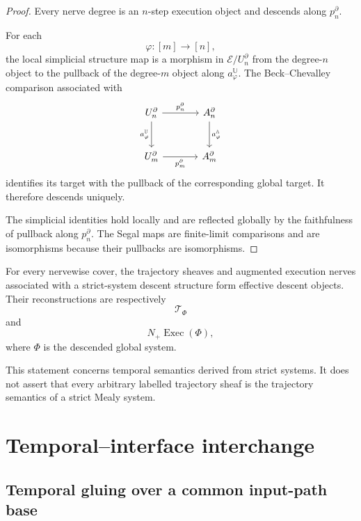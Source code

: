 \begin{proof}
Every nerve degree is an \(n\)-step execution object and descends along
\(p_n^\partial\).

For each
\[
    \varphi:[m]\to[n],
\]
the local simplicial structure map is a morphism in
\(\mathcal E/U_n^\partial\) from the degree-\(n\) object to the pullback of
the degree-\(m\) object along \(a_\varphi^{\mathbb U}\). The
Beck--Chevalley comparison associated with
\[
\begin{tikzcd}[column sep=large,row sep=large]
    U_n^\partial
        \arrow[r, "p_n^\partial"]
        \arrow[d, "a_\varphi^{\mathbb U}"']
    &
    A_n^\partial
        \arrow[d, "a_\varphi^{\mathbb A}"]
    \\
    U_m^\partial
        \arrow[r, "p_m^\partial"']
    &
    A_m^\partial
\end{tikzcd}
\]
identifies its target with the pullback of the corresponding global target.
It therefore descends uniquely.

The simplicial identities hold locally and are reflected globally by the
faithfulness of pullback along \(p_n^\partial\). The Segal maps are
finite-limit comparisons and are isomorphisms because their pullbacks are
isomorphisms.
\end{proof}

\begin{corollary}
\label{cor:stack-temporal-execution-semantics}
For every nervewise cover, the trajectory sheaves and augmented execution
nerves associated with a strict-system descent structure form effective
descent objects. Their reconstructions are respectively
\[
    \mathscr T_\Phi
\]
and
\[
    N_+\operatorname{Exec}(\Phi),
\]
where \(\Phi\) is the descended global system.
\end{corollary}

This statement concerns temporal semantics derived from strict systems. It
does not assert that every arbitrary labelled trajectory sheaf is the
trajectory semantics of a strict Mealy system.

\section{Temporal--interface interchange}
\label{sec:temporal-interface-interchange-rigorous}

\subsection{Temporal gluing over a common input-path base}
\label{subsec:temporal-gluing-recalled}

